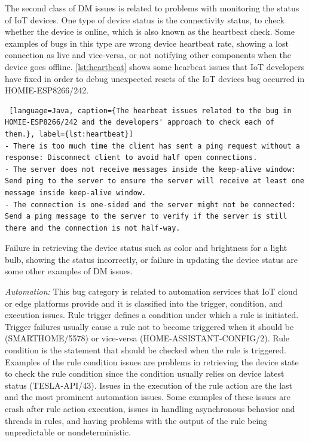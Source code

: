 The second class of DM issues is related to problems with monitoring the status of IoT devices. One type of device status is the connectivity status, to check whether the device is online, which is also known as the heartbeat check. Some examples of bugs in this type are wrong device heartbeat rate, showing a lost connection as live and vice-versa, or not notifying other components when the device goes offline. \autoref{lst:heartbeat} shows some hearbeat issues that IoT developers have fixed in order to debug unexpected resets of the IoT devices bug occurred in HOMIE-ESP8266/242.

\begin{lstlisting} [language=Java, caption={The hearbeat issues related to the bug in HOMIE-ESP8266/242 and the developers' approach to check each of them.}, label={lst:heartbeat}] 
- There is too much time the client has sent a ping request without a response: Disconnect client to avoid half open connections.
- The server does not receive messages inside the keep-alive window: Send ping to the server to ensure the server will receive at least one message inside keep-alive window.
- The connection is one-sided and the server might not be connected: Send a ping message to the server to verify if the server is still there and the connection is not half-way.
\end{lstlisting}

Failure in retrieving the device status such as color and brightness for a light bulb, showing the status incorrectly, or failure in updating the device status are some other examples of DM issues.

\textit{Automation:}
This bug category is related to automation services that IoT cloud or edge platforms provide and it is classified into the trigger, condition, and execution issues. Rule trigger defines a condition under which a rule is initiated. Trigger failures usually cause a rule not to become triggered when it should be (SMARTHOME/5578) or vice-versa (HOME-ASSISTANT-CONFIG/2). Rule condition is the statement that should be checked when the rule is triggered. Examples of the rule condition issues are problems in retrieving the device state to check the rule condition since the condition usually relies on device latest status (TESLA-API/43). Issues in the execution of the rule action are the last and the most prominent automation issues. Some examples of these issues are crash after rule action execution, issues in handling asynchronous behavior and threads in rules, and having problems with the output of the rule being unpredictable or nondeterministic.

